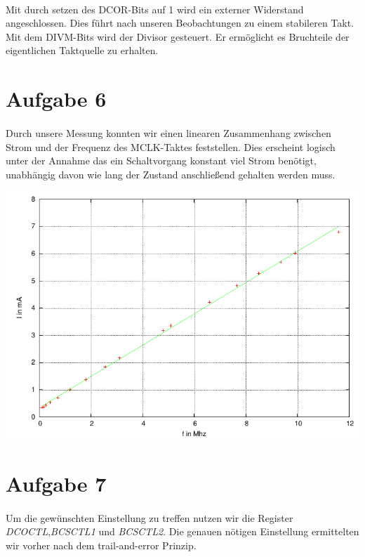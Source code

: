\paragraph*{}
Mit durch setzen des DCOR-Bits auf 1 wird ein externer Widerstand angeschlossen. Dies führt nach unseren Beobachtungen zu einem stabileren Takt. Mit dem DIVM-Bits wird der Divisor gesteuert. Er ermöglicht es Bruchteile der eigentlichen Taktquelle zu erhalten. 

\section*{Aufgabe 6}

\paragraph*{}
Durch unsere Messung konnten wir einen linearen Zusammenhang zwischen Strom und der Frequenz des MCLK-Taktes feststellen. Dies erscheint logisch unter der Annahme das ein Schaltvorgang konstant viel Strom benötigt, unabhängig davon wie lang der Zustand anschließend gehalten werden muss.

\includegraphics[width=\textwidth]{graphs/vfgraph.pdf}


\section*{Aufgabe 7}

\paragraph*{}
Um die gewünschten Einstellung zu treffen nutzen wir die Register {\em DCOCTL},{\em BCSCTL1} und {\em BCSCTL2}. Die genauen nötigen Einstellung ermittelten wir vorher nach dem trail-and-error Prinzip.

